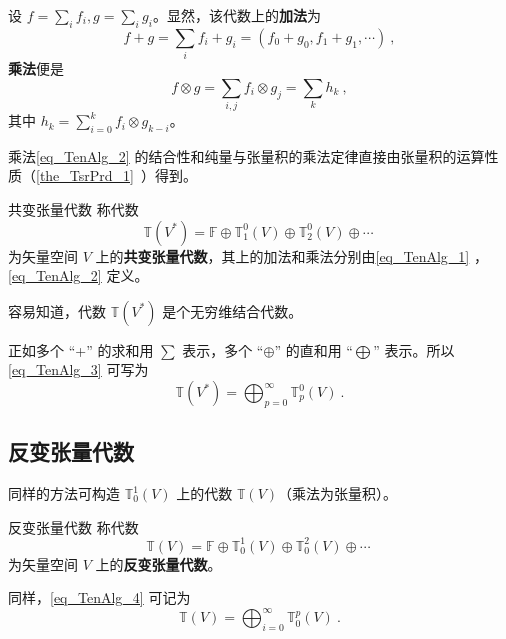 设 $f=\sum\limits_ i f_i,g=\sum\limits_ i g_i$。显然，该代数上的\textbf{加法}为
\begin{equation}\label{eq_TenAlg_1}
f+g=\sum_{i}f_i+g_i=(f_0+g_0,f_1+g_1,\cdots)~,
\end{equation}
\textbf{乘法}便是
\begin{equation}\label{eq_TenAlg_2}
f\otimes g=\sum_{i,j}f_i\otimes g_j=\sum_k h_k~,
\end{equation}
其中 $h_k=\sum\limits_{i=0}^k f_i\otimes g_{k-i}$。

乘法\autoref{eq_TenAlg_2} 的结合性和纯量与张量积的乘法定律直接由张量积的运算性质（\autoref{the_TsrPrd_1}~）得到。

\begin{definition}{共变张量代数}
称代数
\begin{equation}\label{eq_TenAlg_3}
\mathbb T(V^*)=\mathbb F\oplus\mathbb T_1^0(V)\oplus\mathbb T_2^0(V)\oplus\cdots~
\end{equation}
为矢量空间 $V$ 上的\textbf{共变张量代数}，其上的加法和乘法分别由\autoref{eq_TenAlg_1} ，\autoref{eq_TenAlg_2} 定义。
\end{definition}

容易知道，代数 $\mathbb T(V^*)$ 是个无穷维结合代数。

正如多个 “+” 的求和用 $\sum$ 表示，多个 “$\oplus$” 的直和用 “$\bigoplus$” 表示。所以\autoref{eq_TenAlg_3} 可写为
\begin{equation}
\mathbb T(V^*)=\bigoplus_{p=0}^\infty\mathbb T_p^0(V)~.
\end{equation}
 
\subsection{反变张量代数}
同样的方法可构造 $\mathbb T^1_0(V)$ 上的代数 $\mathbb T(V)$（乘法为张量积）。
\begin{definition}{反变张量代数}
称代数
\begin{equation}\label{eq_TenAlg_4}
\mathbb T(V)=\mathbb F\oplus\mathbb T_0^1(V)\oplus\mathbb T_0^2(V)\oplus\cdots~
\end{equation}
为矢量空间 $V$ 上的\textbf{反变张量代数}。
\end{definition}

同样，\autoref{eq_TenAlg_4} 可记为
\begin{equation}
\mathbb T(V)=\bigoplus_{i=0}^\infty \mathbb T_0^p(V)~.
\end{equation}

